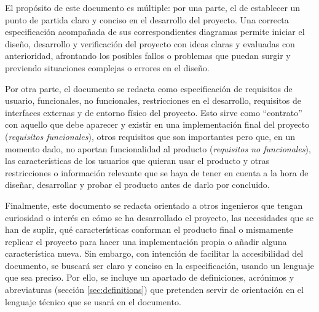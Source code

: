 El propósito de este documento es múltiple: por una parte, el de establecer
un punto de partida claro y conciso en el desarrollo del proyecto. Una correcta
especificación acompañada de sus correspondientes diagramas
permite iniciar el diseño, desarrollo y verificación del proyecto con ideas
claras y evaluadas con anterioridad, afrontando los posibles fallos o problemas
que puedan surgir y previendo situaciones complejas o errores en el diseño.

Por otra parte, el documento se redacta como especificación de
requisitos de usuario, funcionales, no funcionales, restricciones en el
desarrollo, requisitos de interfaces externas y de entorno físico del proyecto.
Esto sirve como ``contrato'' con aquello que debe aparecer y existir en
una implementación final del proyecto (\textit{requisitos funcionales}),
otros requisitos que son importantes pero que, en un momento dado, no aportan
funcionalidad al producto (\textit{requisitos no funcionales}), las
características de los usuarios que quieran usar el producto y otras restricciones
o información relevante que se haya de tener en cuenta a la hora de diseñar, 
desarrollar y probar el producto antes de darlo por concluido.

Finalmente, este documento se redacta orientado a otros ingenieros que
tengan curiosidad o interés en cómo se ha desarrollado el proyecto, las necesidades
que se han de suplir, qué características conforman el producto final o mismamente
replicar el proyecto para hacer una implementación propia o añadir alguna 
característica nueva. Sin embargo, con intención de facilitar la accesibilidad del
documento, se buscará ser claro y conciso en la especificación, usando un
lenguaje que sea preciso. Por ello, se incluye un apartado de definiciones,
acrónimos y abreviaturas (sección \ref{sec:definitions}) que pretenden servir
de orientación en el lenguaje técnico que se usará en el documento.